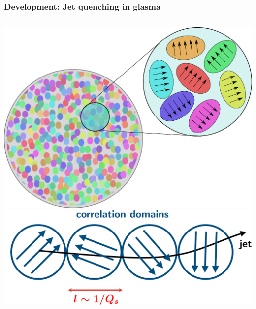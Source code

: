 \documentclass[aspectratio=169,11pt,usenames,dvipsnames]{beamer}
\begin{document}

\begin{frame}
    \frametitle{{\normalsize\color{jyured}\bfseries\sffamily Development: }Jet quenching in glasma}
    \vspace{-15pt}
    \begin{center}
        \begin{columns}[onlytextwidth,t]
            \vspace{5pt}
            \begin{center}
                \includegraphics[width=0.88\columnwidth]{images/target_domains.pdf}
                \\[5pt]
                \includegraphics[width=0.88\columnwidth]{images/glasma_corr_dom_jet.pdf}
            \end{center}


\end{columns}
\end{center}
\end{frame}
\end{document}
